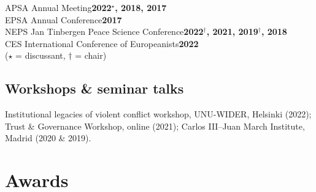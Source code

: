 \documentclass[a4paper, 12pt]{article}
\begin{document}
\noindent
APSA Annual Meeting\hfill\textbf{2022$^\star$, 2018, 2017}\\
EPSA Annual Conference\hfill\textbf{2017}\\
NEPS Jan Tinbergen Peace Science Conference\hfill\textbf{2022$^\dagger$, 2021, 2019$^\dagger$, 2018}\\
CES International Conference of Europeanists\hfill\textbf{2022}\\\vspace{15pt}
\hfill{\footnotesize ($\star$ = discussant, $\dagger$ = chair)}

\vspace{-20pt}

\subsection*{Workshops \& seminar talks}

Institutional legacies of violent conflict workshop, UNU-WIDER, Helsinki (2022); Trust \& Governance Workshop, online (2021); Carlos III--Juan March Institute, Madrid (2020 \& 2019).

\section*{Awards}

\end{document}
